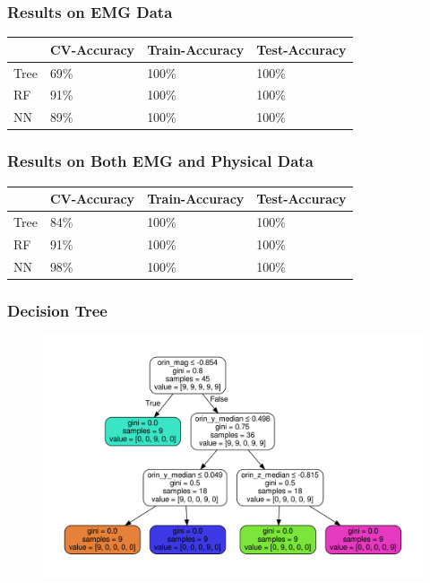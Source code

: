 \documentclass{beamer}
\begin{document}
\begin{frame}
\frametitle{Results on EMG Data}

\begin{tabular}{ |p{2cm}|p{2cm}||p{2cm}|p{2cm}|  }
 \hline
 &CV-Accuracy & Train-Accuracy & Test-Accuracy \\
 \hline
 Tree & 69\% & 100\%  & 100\% \\
 \hline
 RF & 91\%    & 100\%   & 100\% \\
 \hline
 NN & 89\%   & 100\%  & 100\% \\
 \hline
\end{tabular}

\end{frame}

\begin{frame}
\frametitle{Results on Both EMG and Physical Data}

\begin{tabular}{ |p{2cm}|p{2cm}||p{2cm}|p{2cm}|  }
 \hline
 &CV-Accuracy & Train-Accuracy & Test-Accuracy \\
 \hline
 Tree & 84\% & 100\%  & 100\% \\
 \hline
 RF & 91\%    & 100\%   & 100\% \\
 \hline
 NN & 98\%   & 100\%  & 100\% \\
 \hline
\end{tabular}

\end{frame}

\begin{frame}
\frametitle{Decision Tree}
\begin{figure}
\includegraphics[scale=.3]{tree}
\end{figure}
\end{frame}
\end{document}
